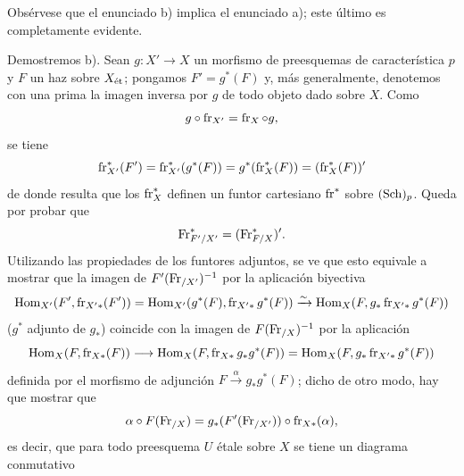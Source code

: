 Obsérvese que el enunciado b) implica el enunciado a); este último es completamente evidente.

Demostremos b). Sean $g:X'\to X$ un morfismo de preesquemas de característica $p$ y $F$ un haz sobre $X_{\mathrm{\acute{e}t}}$; pongamos $F'=g^*(F)$ y, más generalmente, denotemos con una prima la imagen inversa por $g$ de todo objeto dado sobre $X$. Como
\[
g\circ\operatorname{fr}_{X'}=\operatorname{fr}_X\circ g,
\]
se tiene
\[
\operatorname{fr}_{X'}^*(F')=\operatorname{fr}_{X'}^*(g^*(F))=g^*(\operatorname{fr}_X^*(F))=(\operatorname{fr}_X^*(F))'
\]
de donde resulta que los $\operatorname{fr}_X^*$ definen un funtor cartesiano $\operatorname{fr}^*$ sobre $(\operatorname{Sch})_p$. Queda por probar que
\[
\operatorname{Fr}^*_{F'/X'}=(\operatorname{Fr}^*_{F/X})'.
\]
Utilizando las propiedades de los funtores adjuntos, se ve que esto equivale a mostrar que la imagen de $F'(\operatorname{Fr}_{/X'})^{-1}$ por la aplicación biyectiva
\[
\operatorname{Hom}_{X'}(F',\operatorname{fr}_{X'*}(F'))
 =\operatorname{Hom}_{X'}(g^*(F),\operatorname{fr}_{X'*}g^*(F))
 \xrightarrow{\sim} \operatorname{Hom}_X(F,g_*\operatorname{fr}_{X'*}g^*(F))
\]
($g^*$ adjunto de $g_*$) coincide con la imagen de $F(\operatorname{Fr}_{/X})^{-1}$ por la aplicación
\[
\operatorname{Hom}_X(F,\operatorname{fr}_{X*}(F))\longrightarrow
\operatorname{Hom}_X(F,\operatorname{fr}_{X*}g_*g^*(F))=
\operatorname{Hom}_X(F,g_*\operatorname{fr}_{X'*}g^*(F))
\]
definida por el morfismo de adjunción $F\xrightarrow{\alpha} g_*g^*(F)$; dicho de otro modo, hay que mostrar que
\[
\alpha\circ F(\operatorname{Fr}_{/X})=g_*(F'(\operatorname{Fr}_{/X'}))\circ\operatorname{fr}_{X*}(\alpha),
\]
es decir, que para todo preesquema $U$ étale sobre $X$ se tiene un diagrama conmutativo
